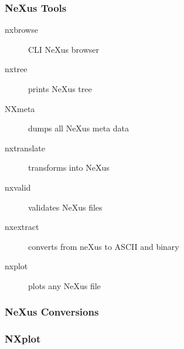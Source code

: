 \documentclass{beamer}
\begin{document}
\begin{frame} \frametitle{NeXus Tools}
\begin{description}
\item[nxbrowse] CLI NeXus browser
\item[nxtree] prints NeXus tree
\item[NXmeta] dumps all NeXus meta data
\item[nxtranslate] transforms into NeXus 
\item[nxvalid] validates NeXus files 
\item[nxextract] converts from neXus to ASCII and binary
\item[nxplot] plots any NeXus file
\end{description}
\end{frame}

\begin{frame} \frametitle{NeXus Conversions}
\begin{figure}[!ht]
\end{figure}
\end{frame}


\begin{frame} \frametitle{NXplot }
\begin{figure}[!ht]
\end{figure}
\end{frame}
\end{document}
